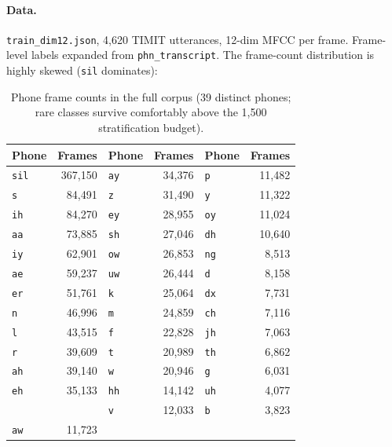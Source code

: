 \documentclass[11pt]{article}
\begin{document}
\paragraph{Data.} \texttt{train\_dim12.json}, 4{,}620 TIMIT utterances, 12-dim MFCC per frame. Frame-level labels expanded from \texttt{phn\_transcript}. The frame-count distribution is highly skewed (\texttt{sil} dominates):

\begin{table}[H]
\centering
\caption{Phone frame counts in the full corpus (39 distinct phones; rare classes survive comfortably above the 1{,}500 stratification budget).}
\begin{tabular}{lrlrlr}
\toprule
Phone & Frames & Phone & Frames & Phone & Frames \\
\midrule
\texttt{sil} & 367{,}150 & \texttt{ay}  & 34{,}376 & \texttt{p}  & 11{,}482 \\
\texttt{s}   &  84{,}491 & \texttt{z}   & 31{,}490 & \texttt{y}  & 11{,}322 \\
\texttt{ih}  &  84{,}270 & \texttt{ey}  & 28{,}955 & \texttt{oy} & 11{,}024 \\
\texttt{aa}  &  73{,}885 & \texttt{sh}  & 27{,}046 & \texttt{dh} & 10{,}640 \\
\texttt{iy}  &  62{,}901 & \texttt{ow}  & 26{,}853 & \texttt{ng} & 8{,}513 \\
\texttt{ae}  &  59{,}237 & \texttt{uw}  & 26{,}444 & \texttt{d}  & 8{,}158 \\
\texttt{er}  &  51{,}761 & \texttt{k}   & 25{,}064 & \texttt{dx} & 7{,}731 \\
\texttt{n}   &  46{,}996 & \texttt{m}   & 24{,}859 & \texttt{ch} & 7{,}116 \\
\texttt{l}   &  43{,}515 & \texttt{f}   & 22{,}828 & \texttt{jh} & 7{,}063 \\
\texttt{r}   &  39{,}609 & \texttt{t}   & 20{,}989 & \texttt{th} & 6{,}862 \\
\texttt{ah}  &  39{,}140 & \texttt{w}   & 20{,}946 & \texttt{g}  & 6{,}031 \\
\texttt{eh}  &  35{,}133 & \texttt{hh}  & 14{,}142 & \texttt{uh} & 4{,}077 \\
             &           & \texttt{v}   & 12{,}033 & \texttt{b}  & 3{,}823 \\
\texttt{aw}  &  11{,}723 &              &          &              &           \\
\bottomrule
\end{tabular}
\end{table}
\end{document}
